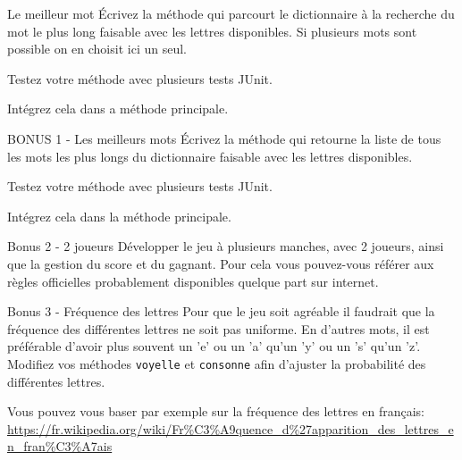 \documentclass[a4paper,11pt]{article}
\begin{document}
 	\begin{Exercice}{Le meilleur mot}
 	 	\'Ecrivez la méthode 
		qui parcourt le dictionnaire à la recherche du mot le plus long faisable 
		avec les lettres disponibles. 
		Si plusieurs mots sont possible on en choisit ici un seul.

		Testez votre méthode avec plusieurs tests JUnit.

		 Intégrez cela dans a méthode principale.
	\end{Exercice}

 	\begin{Exercice}{BONUS 1 - Les meilleurs mots}
 	 	\'Ecrivez la méthode 
		qui retourne la liste de tous les mots les plus longs du dictionnaire 
		faisable avec les lettres disponibles.

		Testez votre méthode avec plusieurs tests JUnit.

		Intégrez cela dans la méthode principale.
	\end{Exercice}


 	\begin{Exercice}{Bonus 2 - 2 joueurs}
		Développer le jeu à plusieurs manches, avec 2 joueurs, 
		ainsi que la gestion du score et du gagnant.
		Pour cela vous pouvez-vous référer aux règles officielles probablement 
		disponibles quelque part sur internet.
	\end{Exercice}
		
 	\begin{Exercice}{Bonus 3 - Fréquence des lettres}
		Pour que le jeu soit agréable il faudrait que la fréquence des différentes
		lettres ne soit pas uniforme. En d'autres mots, il est préférable d'avoir plus
		souvent un 'e' ou un 'a' qu'un 'y' ou un 's' qu'un 'z'. Modifiez vos méthodes
		\texttt{voyelle} et \texttt{consonne} afin d'ajuster la probabilité des
		différentes lettres. 
		
		Vous pouvez vous baser par exemple sur la fréquence des lettres en français:
		 \url{https://fr.wikipedia.org/wiki/Fr%C3%A9quence_d%27apparition_des_lettres_en_fran%C3%A7ais}
	\end{Exercice}
		
\end{document}
